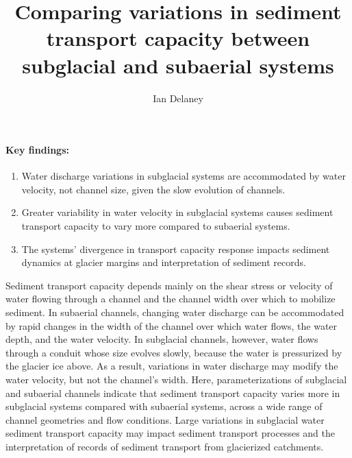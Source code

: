 \documentclass[11pt]{article}
\author[1]{Ian Delaney}
\affil[1]{Institut des dynamiques de la surface terrestre (IDYST), Universit\'{e} de Lausanne


  B\^{a}timent G\'{e}opolis, CH-1015 Lausanne}
\title{Comparing variations in sediment transport capacity between subglacial and subaerial systems }
\begin{document}
\maketitle

\paragraph{Key findings:}
\begin{enumerate}
\item Water discharge variations in subglacial systems are accommodated by water velocity, not channel size, given the slow evolution of channels.

\item  Greater variability in water velocity in subglacial systems causes sediment transport capacity to vary more compared to subaerial systems.


\item The systems' divergence in transport capacity response impacts sediment dynamics at glacier margins and interpretation of sediment records.
\end{enumerate}

\abstract %
Sediment transport capacity depends mainly on the shear stress or velocity of water flowing through a channel and the channel width over which to mobilize sediment.
In subaerial channels, changing water discharge can be accommodated by rapid changes in the width of the channel over which water flows, the water depth, and the water velocity.
In subglacial channels, however, water flows through a conduit whose size evolves  slowly, because the water is pressurized by the glacier ice above.
As a result, variations in water discharge may modify the water velocity, but not the channel's width.
Here, parameterizations of subglacial and subaerial channels indicate that sediment transport capacity varies more in subglacial systems compared with subaerial systems, across a wide range of channel geometries and flow conditions.
Large variations in subglacial water sediment transport capacity may impact sediment transport processes and the interpretation of records of sediment transport from glacierized catchments.

\vspace{0.5cm}
\end{document}
